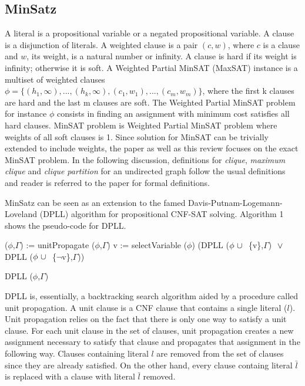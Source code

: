 \subsection{MinSatz}
A literal is a propositional variable or a negated propositional variable. A
clause is a disjunction of literals. A weighted clause is a pair $(c, w)$, where
$c$ is a clause and $w$, its weight, is a natural number or infinity. A clause is
hard if its weight is infinity; otherwise it is soft. A Weighted Partial MinSAT
(MaxSAT) instance is a multiset of weighted clauses $\phi =
\{(h_1,\infty),...,(h_k,\infty),(c_1, w_1),...,(c_m, w_m)\}$, where the ﬁrst k
clauses are hard and the last m clauses are soft. The Weighted Partial MinSAT
problem for instance $\phi$ consists in finding an assignment with minimum cost
satisfies all hard clauses. MinSAT problem is Weighted Partial MinSAT problem
where weights of all soft clauses is 1. Since solution for MinSAT can be
trivially extended to include weights, the paper as well as this review focuses
on the exact MinSAT problem. In the following discussion, definitions for
\emph{clique}, \emph{maximum clique} and \emph{clique partition} for an
undirected graph follow the usual definitions and reader is referred to the
paper for formal definitions.

MinSatz can be seen as an extension to the famed Davis-Putnam-Logemann-Loveland
(DPLL) algorithm for propositional CNF-SAT solving. Algorithm 1
shows the pseudo-code for DPLL. 
\begin{algorithm}
 \SetAlgoLined 
 ($\phi$,$\Gamma$) := unitPropagate ($\phi$,$\Gamma$)\;
  v := selectVariable ($\phi$)\;
  \Return (DPLL ($\phi ~\cup~ $ \{v\},$\Gamma$) $~\vee~$ 
          DPLL ($\phi ~\cup~ $ \{$\neg$v\},$\Gamma$))
 \caption{DPLL ($\phi$,$\Gamma$)}
\end{algorithm}
DPLL is, essentially, a backtracking search algorithm aided by a procedure
called unit propagation. A unit clause is a CNF clause that contains a single
literal ($l$). Unit propagation relies on the fact that there is only one way to
satisfy a unit clause. For each unit clause in the set of clauses, unit
propagation creates a new assignment necessary to satisfy that clause and
propagates that assignment in the following way. Clauses containing literal $l$
are removed from the set of clauses since they are already satisfied. On the
other hand, every clause containg literal $\bar{l}$ is replaced with a clause
with literal $\bar{l}$ removed. 


